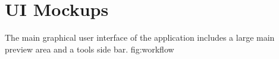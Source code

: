 \section{UI Mockups}
{The main graphical user interface of the application includes a large main preview area and a tools side bar.}
{fig:workflow}



